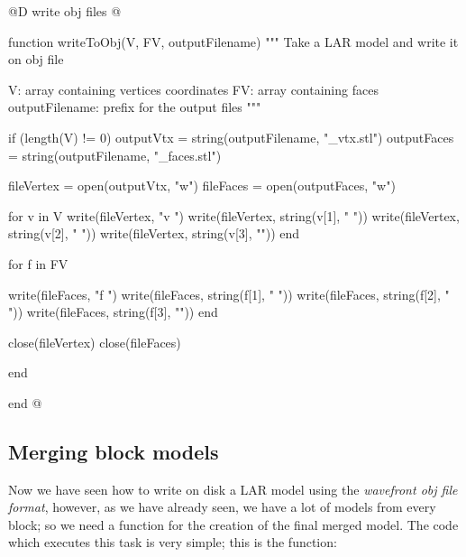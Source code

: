\documentclass[11pt,oneside]{article}	%
\begin{document}
@D write obj files
@{function writeToObj(V, FV, outputFilename)
  """
  Take a LAR model and write it on obj file

  V: array containing vertices coordinates
  FV: array containing faces
  outputFilename: prefix for the output files
  """

  if (length(V) != 0)
    outputVtx = string(outputFilename, "_vtx.stl")
    outputFaces = string(outputFilename, "_faces.stl")

    fileVertex = open(outputVtx, "w")
    fileFaces = open(outputFaces, "w")

    for v in V
      write(fileVertex, "v ")
      write(fileVertex, string(v[1], " "))
      write(fileVertex, string(v[2], " "))
      write(fileVertex, string(v[3], "\n"))
    end

    for f in FV

      write(fileFaces, "f ")
      write(fileFaces, string(f[1], " "))
      write(fileFaces, string(f[2], " "))
      write(fileFaces, string(f[3], "\n"))
    end

    close(fileVertex)
    close(fileFaces)

  end

end @}

\subsection{Merging block models}\label{sec:mergeObj}

Now we have seen how to write on disk a LAR model using the \textit{wavefront obj file format}, however, as we have already seen, we have a lot of models from every block; so we need a function for the creation of the final merged model. The code which executes this task is very simple; this is the function:
\end{document}
